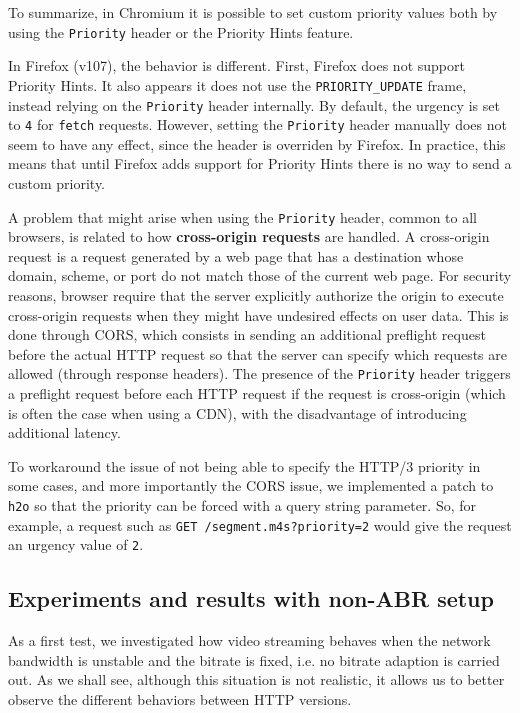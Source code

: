 To summarize, in Chromium it is possible to set custom priority values both by using the \texttt{Priority} header or the Priority Hints feature.

In Firefox (v107), the behavior is different. First, Firefox does not support Priority Hints. It also appears it does not use the \texttt{PRIORITY\_UPDATE} frame, instead relying on the \texttt{Priority} header internally. By default, the urgency is set to \texttt{4} for \texttt{fetch} requests. However, setting the \texttt{Priority} header manually does not seem to have any effect, since the header is overriden by Firefox. In practice, this means that until Firefox adds support for Priority Hints there is no way to send a custom priority.

A problem that might arise when using the \texttt{Priority} header, common to all browsers, is related to how \textbf{cross-origin requests} are handled. A cross-origin request is a request generated by a web page that has a destination whose domain, scheme, or port do not match those of the current web page. For security reasons, browser require that the server explicitly authorize the origin to execute cross-origin requests when they might have undesired effects on user data. This is done through CORS, which consists in sending an additional preflight request before the actual HTTP request so that the server can specify which requests are allowed (through response headers). The presence of the \texttt{Priority} header triggers a preflight request before each HTTP request if the request is cross-origin (which is often the case when using a CDN), with the disadvantage of introducing additional latency.

To workaround the issue of not being able to specify the HTTP/3 priority in some cases, and more importantly the CORS issue, we implemented a patch to \texttt{h2o} so that the priority can be forced with a query string parameter. So, for example, a request such as \texttt{GET /segment.m4s?priority=2} would give the request an urgency value of \texttt{2}.

\subsection{Experiments and results with non-ABR setup}
\label{sec:eval/non-abr}

As a first test, we investigated how video streaming behaves when the network bandwidth is unstable and the bitrate is fixed, i.e. no bitrate adaption is carried out. As we shall see, although this situation is not realistic, it allows us to better observe the different behaviors between HTTP versions.

